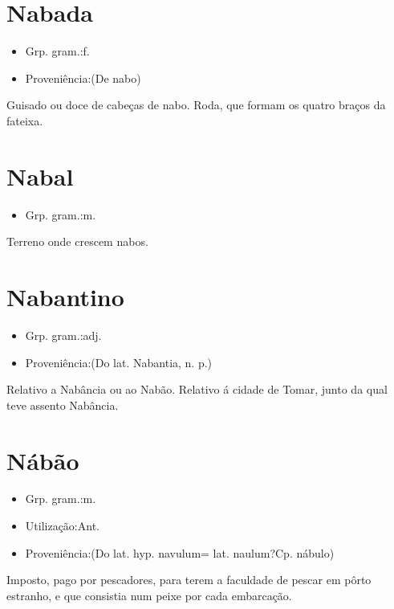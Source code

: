 \section{Nabada}
\begin{itemize}
\item {Grp. gram.:f.}
\end{itemize}
\begin{itemize}
\item {Proveniência:(De \textunderscore nabo\textunderscore )}
\end{itemize}
Guisado ou doce de cabeças de nabo.
Roda, que formam os quatro braços da fateixa.
\section{Nabal}
\begin{itemize}
\item {Grp. gram.:m.}
\end{itemize}
Terreno onde crescem nabos.
\section{Nabantino}
\begin{itemize}
\item {Grp. gram.:adj.}
\end{itemize}
\begin{itemize}
\item {Proveniência:(Do lat. \textunderscore Nabantia\textunderscore , n. p.)}
\end{itemize}
Relativo a Nabância ou ao Nabão.
Relativo á cidade de Tomar, junto da qual teve assento Nabância.
\section{Nábão}
\begin{itemize}
\item {Grp. gram.:m.}
\end{itemize}
\begin{itemize}
\item {Utilização:Ant.}
\end{itemize}
\begin{itemize}
\item {Proveniência:(Do lat. hyp. \textunderscore navulum\textunderscore  = lat. \textunderscore naulum?\textunderscore  Cp. \textunderscore nábulo\textunderscore )}
\end{itemize}
Imposto, pago por pescadores, para terem a faculdade de pescar em pôrto estranho, e que consistia num peixe por cada embarcação.
